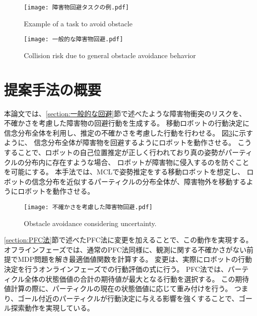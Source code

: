 \begin{figure}[H]
  \begin{center}
    \texttt{[image: 障害物回避タスクの例.pdf]}
    \caption{Example of a task to avoid obstacle}
    \label{fig:障害物回避タスクの例}
  \end{center}
\end{figure}

\begin{figure}[H]
  \begin{center}
    \texttt{[image: 一般的な障害物回避.pdf]}
    \caption{Collision risk due to general obstacle avoidance behavior}
    \label{fig:一般的な障害物回避}
  \end{center}
\end{figure}


\section{提案手法の概要} \label{section:method overview}
本論文では、\ref{section:一般的な回避}節で述べたような障害物衝突のリスクを、
不確かさを考慮した障害物の回避行動を生成する。
移動ロボットの行動決定に信念分布全体を利用し、推定の不確かさを考慮した行動を行わせる。
図\ref{fig:不確かさを考慮した障害物回避}に示すように、
信念分布全体が障害物を回避するようにロボットを動作させる。
こうすることで、ロボットの自己位置推定が正しく行われており真の姿勢がパーティクルの分布内に存在すような場合、
ロボットが障害物に侵入するのを防ぐことを可能にする。
本手法では、MCLで姿勢推定をする移動ロボットを想定し、
ロボットの信念分布を近似するパーティクルの分布全体が、障害物外を移動するようにロボットを動作させる。

\begin{figure}[H]
  \begin{center}
    \texttt{[image: 不確かさを考慮した障害物回避.pdf]}
    \caption{Obstacle avoidance considering uncertainty.}
    \label{fig:不確かさを考慮した障害物回避}
  \end{center}
\end{figure}

\ref{section:PFC法}節で述べたPFC法に変更を加えることで、この動作を実現する。
オフラインフェーズでは、通常のPFC法同様に、観測に関する不確かさがない前提でMDP問題を解き最適価値関数を計算する。
変更は、実際にロボットの行動決定を行うオンラインフェーズでの行動評価の式に行う。
PFC法では、パーティクル全体の状態価値の合計の期待値が最大となる行動を選択する。
この期待値計算の際に、パーティクルの現在の状態価値に応じて重み付けを行う。
つまり、ゴール付近のパーティクルが行動決定に与える影響を強くすることで、ゴール探索動作を実現している。

